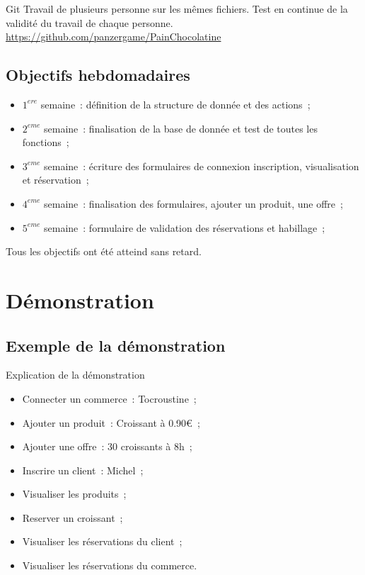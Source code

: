 \documentclass{beamer}
\begin{document}
\begin{frame}{Git}
	Travail de plusieurs personne sur les mêmes fichiers.
	\bigbreak
	Test en continue de la validité du travail de chaque personne.
	\bigbreak
	\url{https://github.com/panzergame/PainChocolatine}
\end{frame}

\subsection{Objectifs hebdomadaires}

\begin{frame}
	\begin{itemize}
		\item $1^{ere}$ semaine~: définition de la structure de donnée et des actions~;
		\item $2^{eme}$ semaine~: finalisation de la base de donnée et test de toutes les fonctions~;
		\item $3^{eme}$ semaine~: écriture des formulaires de connexion inscription, visualisation et réservation~;
		\item $4^{eme}$ semaine~: finalisation des formulaires, ajouter un produit, une offre~;
		\item $5^{eme}$ semaine~: formulaire de validation des réservations et habillage~;
	\end{itemize}

	Tous les objectifs ont été atteind sans retard.

\end{frame}

\section{Démonstration}

\subsection{Exemple de la démonstration}

\begin{frame}{Explication de la démonstration}
	\begin{itemize}
		\item Connecter un commerce~: Tocroustine~;
		\item Ajouter un produit~: Croissant à 0.90\euro~;
		\item Ajouter une offre~: 30 croissants à 8h~;
		\item Inscrire un client~: Michel~;
		\item Visualiser les produits~;
		\item Reserver un croissant~;
		\item Visualiser les réservations du client~;
		\item Visualiser les réservations du commerce.
	\end{itemize}
\end{frame}
\end{document}
